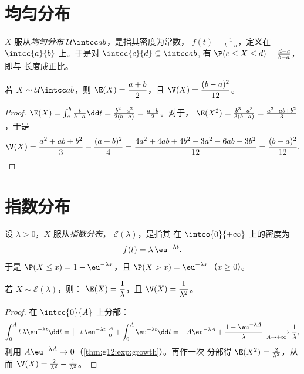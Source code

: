 \section{均匀分布}

\begin{definition}[均匀分布]\label{def:g12:contdist:uniform}
$X$ 服从\emph{均匀分布}
$\mathcal U\intcc ab$，是指其密度为常数，
$f(t) = \frac{1}{b-a}$，定义在 $\intcc{a}{b}$ 上。于是对
$\intcc{c}{d} \subseteq \intcc ab$,
有 $\P(c \leq X \leq d) = \frac{d - c}{b - a}$，即与
长度成正比。
\end{definition}

\begin{proposition}\label{prop:g12:contdist:uniformmoments}
若 $X \sim \mathcal U\intcc ab$，则
$\E(X) = \dfrac{a+b}{2}$，且 $\V(X) = \dfrac{(b-a)^2}{12}$。
\end{proposition}

\begin{proof}
$\E(X) = \int_a^b \frac{t}{b-a}\dd t
= \frac{b^2 - a^2}{2(b-a)} = \frac{a+b}{2}$。对于，
$\E(X^2) = \frac{b^3 - a^3}{3(b-a)} = \frac{a^2 + ab + b^2}{3}$，于是
\[
\V(X) = \frac{a^2 + ab + b^2}{3} - \frac{(a+b)^2}{4}
= \frac{4a^2 + 4ab + 4b^2 - 3a^2 - 6ab - 3b^2}{12}
= \frac{(b - a)^2}{12}. \qedhere
\]
\end{proof}

\section{指数分布}

\begin{definition}[指数分布]\label{def:g12:contdist:expo}
设 $\lambda > 0$，$X$ 服从\emph{指数分布}，
$\mathcal E(\lambda)$，是指其
在 $\intco{0}{+\infty}$ 上的密度为
\[
f(t) = \lambda\,\eu^{-\lambda t}.
\]
于是 $\P(X \leq x) = 1 - \eu^{-\lambda x}$，且
$\P(X > x) = \eu^{-\lambda x}$（$x \geq 0$）。
\end{definition}

\begin{proposition}\label{prop:g12:contdist:expomoments}
若 $X \sim \mathcal E(\lambda)$，则：
$\E(X) = \dfrac{1}{\lambda}$，且 $\V(X) = \dfrac{1}{\lambda^2}$。
\end{proposition}

\begin{proof}
在 $\intcc{0}{A}$ 上分部：
\[
\int_0^A t\,\lambda\eu^{-\lambda t}\dd t
= \bigl[-t\,\eu^{-\lambda t}\bigr]_0^A + \int_0^A \eu^{-\lambda t}\dd t
= -A\eu^{-\lambda A} + \frac{1 - \eu^{-\lambda A}}{\lambda}
\xrightarrow[A\to+\infty]{} \frac1\lambda,
\]
利用 $A\eu^{-\lambda A} \to 0$（\cref{thm:g12:exp:growth}）。再作一次
分部得 $\E(X^2) = \frac{2}{\lambda^2}$，从而
$\V(X) = \frac{2}{\lambda^2} - \frac{1}{\lambda^2}$。
\end{proof}

